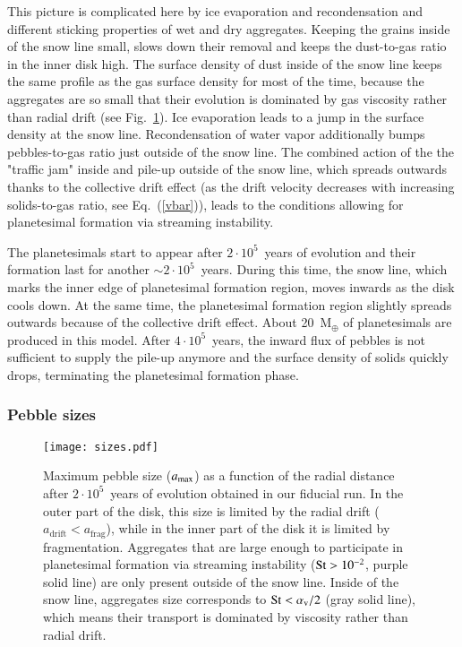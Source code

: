 \documentclass{aa}
\begin{document}
This picture is complicated here by ice evaporation and recondensation and different sticking properties of wet and dry aggregates. Keeping the grains inside of the snow line small, slows down their removal and keeps the dust-to-gas ratio in the inner disk high. The surface density of dust inside of the snow line keeps the same profile as the gas surface density for most of the time, because the aggregates are so small that their evolution is dominated by gas viscosity rather than radial drift (see Fig.~\ref{fig:sizes}). Ice evaporation leads to a jump in the surface density at the snow line. Recondensation of water vapor additionally bumps pebbles-to-gas ratio just outside of the snow line.
The combined action of the the "traffic jam" inside and pile-up outside of the snow line, which spreads outwards thanks to the collective drift effect (as the drift velocity decreases with increasing solids-to-gas ratio, see Eq.~(\ref{vbar})), leads to the conditions allowing for planetesimal formation via streaming instability.

The planetesimals start to appear after $2\cdot10^5$~years of evolution and their formation last for another $\sim2\cdot10^5$~years. During this time, the snow line, which marks the inner edge of planetesimal formation region, moves inwards as the disk cools down. At the same time, the planetesimal formation region slightly spreads outwards because of the collective drift effect. About 20~M$_{\oplus}$ of planetesimals are produced in this model. After $4\cdot10^5$~years, the inward flux of pebbles is not sufficient to supply the pile-up anymore and the surface density of solids quickly drops, terminating the planetesimal formation phase. 

\subsubsection{Pebble sizes}

\begin{figure}
   \centering
   \texttt{[image: sizes.pdf]}
      \caption{Maximum pebble size ($a_{\rm{max}}$) as a function of the radial distance after $2\cdot10^5$~years of evolution obtained in our fiducial run. In the outer part of the disk, this size is limited by the radial drift ($a_{\mathrm{drift}} < a_{\mathrm{frag}}$), while in the inner part of the disk it is limited by fragmentation. Aggregates that are large enough to participate in planetesimal formation via streaming instability (${\rm St}>10^{-2}$, purple solid line) are only present outside of the snow line. Inside of the snow line, aggregates size corresponds to ${\rm St}<\alpha_{\rm v}/2$ (gray solid line), which means their transport is dominated by viscosity rather than radial drift.}
      \label{fig:sizes}
\end{figure}
\end{document}
